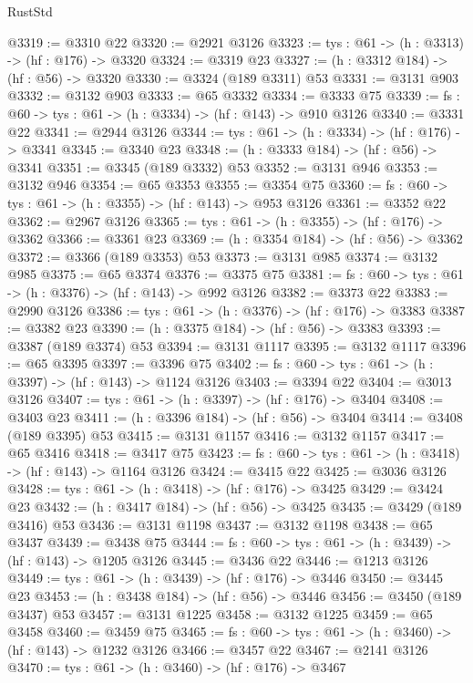 \begin{lexlean}{RustStd}
\begin{coremodule}
@3319 := @3310 @22
@3320 := @2921 @3126
@3323 := {tys : @61} -> (h : @3313) -> (hf : @176) -> @3320
@3324 := @3319 @23
@3327 := (h : @3312 @184) -> (hf : @56) -> @3320
@3330 := @3324 (@189 @3311) @53
@3331 := @3131 @903
@3332 := @3132 @903
@3333 := @65 @3332
@3334 := @3333 @75
@3339 := {fs : @60} -> {tys : @61} -> (h : @3334) -> (hf : @143) -> @910 @3126
@3340 := @3331 @22
@3341 := @2944 @3126
@3344 := {tys : @61} -> (h : @3334) -> (hf : @176) -> @3341
@3345 := @3340 @23
@3348 := (h : @3333 @184) -> (hf : @56) -> @3341
@3351 := @3345 (@189 @3332) @53
@3352 := @3131 @946
@3353 := @3132 @946
@3354 := @65 @3353
@3355 := @3354 @75
@3360 := {fs : @60} -> {tys : @61} -> (h : @3355) -> (hf : @143) -> @953 @3126
@3361 := @3352 @22
@3362 := @2967 @3126
@3365 := {tys : @61} -> (h : @3355) -> (hf : @176) -> @3362
@3366 := @3361 @23
@3369 := (h : @3354 @184) -> (hf : @56) -> @3362
@3372 := @3366 (@189 @3353) @53
@3373 := @3131 @985
@3374 := @3132 @985
@3375 := @65 @3374
@3376 := @3375 @75
@3381 := {fs : @60} -> {tys : @61} -> (h : @3376) -> (hf : @143) -> @992 @3126
@3382 := @3373 @22
@3383 := @2990 @3126
@3386 := {tys : @61} -> (h : @3376) -> (hf : @176) -> @3383
@3387 := @3382 @23
@3390 := (h : @3375 @184) -> (hf : @56) -> @3383
@3393 := @3387 (@189 @3374) @53
@3394 := @3131 @1117
@3395 := @3132 @1117
@3396 := @65 @3395
@3397 := @3396 @75
@3402 := {fs : @60} -> {tys : @61} -> (h : @3397) -> (hf : @143) -> @1124 @3126
@3403 := @3394 @22
@3404 := @3013 @3126
@3407 := {tys : @61} -> (h : @3397) -> (hf : @176) -> @3404
@3408 := @3403 @23
@3411 := (h : @3396 @184) -> (hf : @56) -> @3404
@3414 := @3408 (@189 @3395) @53
@3415 := @3131 @1157
@3416 := @3132 @1157
@3417 := @65 @3416
@3418 := @3417 @75
@3423 := {fs : @60} -> {tys : @61} -> (h : @3418) -> (hf : @143) -> @1164 @3126
@3424 := @3415 @22
@3425 := @3036 @3126
@3428 := {tys : @61} -> (h : @3418) -> (hf : @176) -> @3425
@3429 := @3424 @23
@3432 := (h : @3417 @184) -> (hf : @56) -> @3425
@3435 := @3429 (@189 @3416) @53
@3436 := @3131 @1198
@3437 := @3132 @1198
@3438 := @65 @3437
@3439 := @3438 @75
@3444 := {fs : @60} -> {tys : @61} -> (h : @3439) -> (hf : @143) -> @1205 @3126
@3445 := @3436 @22
@3446 := @1213 @3126
@3449 := {tys : @61} -> (h : @3439) -> (hf : @176) -> @3446
@3450 := @3445 @23
@3453 := (h : @3438 @184) -> (hf : @56) -> @3446
@3456 := @3450 (@189 @3437) @53
@3457 := @3131 @1225
@3458 := @3132 @1225
@3459 := @65 @3458
@3460 := @3459 @75
@3465 := {fs : @60} -> {tys : @61} -> (h : @3460) -> (hf : @143) -> @1232 @3126
@3466 := @3457 @22
@3467 := @2141 @3126
@3470 := {tys : @61} -> (h : @3460) -> (hf : @176) -> @3467

\end{coremodule}
\end{lexlean}
